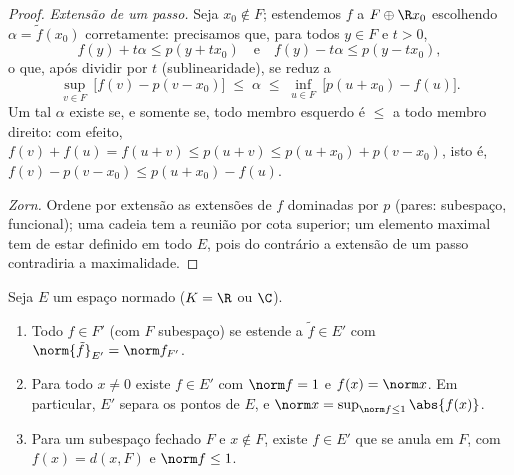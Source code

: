 \begin{proof}
\emph{Extensão de um passo.} Seja $x_0 \notin F$; estendemos $f$ a $F \oplus \R x_0$
escolhendo $\alpha = \tilde f(x_0)$ corretamente: precisamos que, para todos $y \in F$ e
$t > 0$,
\[
f(y) + t\alpha \leq p(y + tx_0)
\quad\text{e}\quad
f(y) - t\alpha \leq p(y - tx_0),
\]
o que, após dividir por $t$ (sublinearidade), se reduz a
\[
\sup_{v \in F}\ \bigl[f(v) - p(v - x_0)\bigr]
\;\leq\; \alpha \;\leq\;
\inf_{u \in F}\ \bigl[p(u + x_0) - f(u)\bigr].
\]
Um tal $\alpha$ existe se, e somente se, todo membro esquerdo é
$\leq$ a todo membro direito: com efeito, $f(v) + f(u) = f(u + v) \leq p(u + v) \leq
p(u + x_0) + p(v - x_0)$, isto é, $f(v) - p(v - x_0) \leq p(u +
x_0) - f(u)$.

\emph{Zorn.} Ordene por extensão as extensões de $f$ dominadas por
$p$ (pares: subespaço, funcional); uma cadeia tem a reunião por cota
superior; um elemento maximal tem de estar definido em todo $E$,
pois do contrário a extensão de um passo contradiria a maximalidade.
\end{proof}

\begin{corollary}\label{cor:b3:banach:hbnormed}
Seja $E$ um espaço normado ($K = \R$ ou $\C$).
\begin{enumerate}
  \item Todo $f \in F'$ (com $F$ subespaço) se estende a $\tilde f
        \in E'$ com $\norm{\tilde f}_{E'} = \norm f_{F'}$.
  \item Para todo $x \neq 0$ existe $f \in E'$ com $\norm f
        = 1$ e $f(x) = \norm x$. Em particular,
        $E'$ separa os pontos de $E$, e $\norm x = \sup_{\norm f \leq
        1}\abs{f(x)}$.
  \item Para um subespaço fechado $F$ e $x \notin F$, existe $f
        \in E'$ que se
        anula em $F$, com $f(x) = d(x, F)$ e $\norm f \leq 1$.
\end{enumerate}
\end{corollary}

